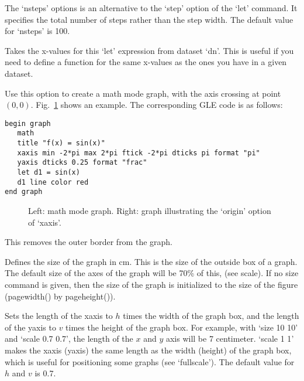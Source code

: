 \begin{commanddescription}
\item[{\sf let ds = \ldots [nsteps {\it n}]}]

The `nsteps' options is an alternative to the `step' option of the `let' command. It specifies the total number of steps rather than the step width. The default value for `nsteps' is 100.

\item[{\sf let ds = \ldots [range {\it dn}]}]

Takes the x-values for this `let' expression from dataset `dn'. This is useful if you need to define a function for the same x-values as the ones you have in a given dataset.

\item[{\sf math}]
Use this option to create a math mode graph, with the axis crossing at point $(0,0)$. Fig.~\ref{grmath:fig} shows an example. The corresponding GLE code is as follows:

\begin{Verbatim}
begin graph
   math
   title "f(x) = sin(x)"
   xaxis min -2*pi max 2*pi ftick -2*pi dticks pi format "pi"
   yaxis dticks 0.25 format "frac"
   let d1 = sin(x)
   d1 line color red
end graph
\end{Verbatim}

\begin{figure}[tb]
\centering
\mbox{}
\caption{\label{grmath:fig}Left: math mode graph. Right: graph illustrating the `{\sf origin}' option of `{\sf xaxis}'.}
\end{figure}


\item[{\sf nobox}]
This removes the outer border from the graph.

\item[{\sf size {\it x y }}]
Defines the size of the graph in cm.  This is the size of the outside box of a graph. The default size of the axes of the graph will be 70\% of this, (see {\sf scale}). If no {\sf size} command is given, then the size of the graph is initialized to the size of the figure ({\sf pagewidth()} by {\sf pageheight()}).

\item[{\sf scale {\it h v}}]
Sets the length of the xaxis to $h$ times the width of the graph box, and the length of the yaxis to $v$ times the height of the graph box. For example, with `{\sf size 10 10}' and `{\sf scale 0.7 0.7}', the length of the $x$ and $y$ axis will be 7 centimeter. `{\sf scale 1 1}' makes the xaxis (yaxis) the same length as the width (height) of the graph box, which is useful for positioning some graphs (see `{\sf fullscale}'). The default value for $h$ and $v$ is 0.7.


\end{commanddescription}
